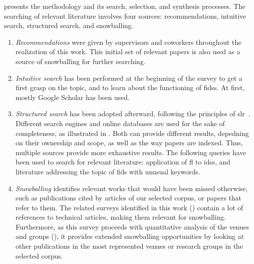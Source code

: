  presents the methodology and its search, selection, and synthesis processes.
The searching of relevant literature involves four sources: recommendations, intuitive search, structured search, and snowballing.
\begin{enumerate}[(1)]
  \item \emph{Recommendations} were given by supervisors and coworkers throughout the realization of this work.
  This initial set of relevant papers is also used as a source of snowballing for further searching.

  \item \emph{Intuitive search} has been performed at the beginning of the survey to get a first grasp on the topic, and to learn about the functioning of \glspl{fids}.
  At first, mostly Google Scholar has been used.

  \item \emph{Structured search} has been adopted afterward, following the principles of \gls{slr}~\cite{kitchenham_Guidelinesperformingsystematic_2007}.
  Different search engines and online databases are used for the sake of completeness, as illustrated in .
  Both can provide different results, depedning on their ownership and scope, as well as the way papers are indexed.
  Thus, multiple sources provide more exhaustive results.
  The following queries have been used to search for relevant literature:
   application of \gls{fl} to \glspl{ids}, and  literature addressing the topic of \gls{fids} with unusual keywords.

  \item \emph{Snowballing} identifies relevant works that would have been missed otherwise, such as publications cited by articles of our selected corpus, or papers that refer to them.
  The related surveys identified in this work () contain a lot of references to technical articles, making them relevant for snowballing.
  Furthermore, as this survey proceeds with quantitative analysis of the venues and groups (), it provides extended snowballing opportunities by looking at other publications in the most represented venues or research groups in the selected corpus.

\end{enumerate}

